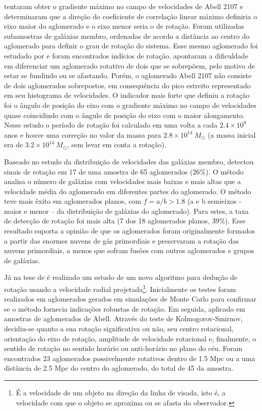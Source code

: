  tentaram obter o gradiente máximo no campo de velocidades de Abell 2107 e determinaram que a direção do coeficiente de correlação linear máximo definiria o eixo maior do aglomerado e o eixo menor seria o de rotação. Foram utilizadas subamostras de galáxias membro, ordenadas de acordo a distância ao centro do aglomerado para definir o grau de rotação do sistema. Esse mesmo aglomerado foi estudado por  e foram encontrados indícios de rotação.  apontaram a dificuldade em diferenciar um aglomerado rotativo de dois que se sobrepõem, pelo motivo de estar se fundindo ou se afastando. Porém, o aglomerado  Abell 2107 não consiste de dois aglomerados sobrepostos, em consequência do pico estreito representado em seu histograma de velocidades. O indicador mais forte que definiu a rotação foi o ângulo de posição do eixo com o gradiente máximo no campo de velocidades quase coincidindo com o ângulo de posição do eixo com o maior alongamento.  Nesse estudo o período de rotação foi calculado em uma volta a cada $2.4\times10^9$ anos e houve uma correção no valor da massa para $2.8\times10^{14}~{M_\odot}$  (a massa inicial era de $3.2\times10^{14}~{M_\odot}$, sem levar em conta a rotação). 

Baseado no estudo da distribuição de velocidades das galáxias membro,  detectou
sinais de rotação em 17 de uma amostra de 65 aglomerados (26\%).
O método analisa o número de galáxias com velocidades mais baixas e mais altas que a velocidade média do aglomerado em diferentes partes do aglomerado. O método teve mais êxito em aglomerados planos, com $f=a/b > 1.8$ (a e b semieixos - maior e menor – da distribuição de galáxias do aglomerado). 
Para estes, a taxa de detecção de rotação foi mais alta (7 dos 18 aglomerados planos, 39\%).  Esse resultado suporta a opinião de que os aglomerados foram originalmente formados a partir das enormes nuvens de gás primordiais e preservaram a rotação das nuvens primordiais, a menos que sofram fusões com outros aglomerados e grupos de galáxias. 

Já na tese de  é realizado um estudo de um novo algoritmo para dedução de rotação usando a velocidade radial projetada\footnote{É a velocidade de um objeto na direção da linha de visada, isto é, a velocidade com que o objeto se aproxima ou se afasta do observador.}. Inicialmente os testes foram realizados em aglomerados gerados em simulações de Monte Carlo para confirmar se o método fornecia indicações robustas de rotação. Em seguida, aplicado em amostras de aglomerados de Abell. Através do teste de Kolmogorov-Smirnov, decidiu-se quanto a sua rotação significativa ou não, seu centro rotacional, orientação do eixo de rotação, amplitude de velocidade rotacional e, finalmente, o sentido de rotação no sentido horário ou anti-horário no plano do céu. Foram encontrados 23 aglomerados possivelmente rotativos dentro de 1.5 Mpc ou a uma distância de 2.5 Mpc do centro do aglomerado, do total de 45 da amostra.

